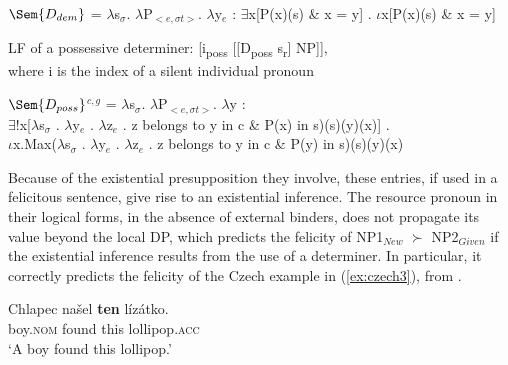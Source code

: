 \documentclass[output=paper,modfonts,nonflat]{langsci/langscibook}
\begin{document}
\ea
$\Sem{D_{dem}}$ = $\lambda$s$_{\sigma}$. $\lambda$P$_{<e,\sigma t>}$. $\lambda$y$_{e}$ : $\exists$x[P(x)(s) \& x = y] . $\iota$x[P(x)(s) \& x = y] \label{definition:demonstrative}
\z


\ea LF of a possessive determiner:
[i\textsubscript{poss} [[D\textsubscript{poss} s\textsubscript{r}] NP]],\\
where i is the index of a silent individual pronoun
\z

\ea
$\Sem{D_{poss}}$$^{c,g}$ = $\lambda$s$_{\sigma}$. $\lambda$P$_{<e,\sigma t>}$. $\lambda$y : \label{definition:possessive}\\
$\exists$!x[$\lambda$s$_{\sigma}$ . $\lambda$y$_{e}$ . $\lambda$z$_{e}$ .  z belongs to y in c \& P(x) in s)(s)(y)(x)] .\\
$\iota$x.Max($\lambda$s$_{\sigma}$ . $\lambda$y$_{e}$ . $\lambda$z$_{e}$ . z belongs to y in c \& P(y) in s)(s)(y)(x)
\z

Because of the existential presupposition they involve, these entries, if used in a felicitous sentence, give rise to an existential inference. The resource pronoun in their logical forms, in the absence of external binders, does not propagate its value beyond the local DP, which predicts the felicity of NP1$_{New}$ $\succ$ NP2$_{Given}$ if the existential inference results from the use of a determiner. In particular, it correctly predicts the felicity of the Czech example in (\ref{ex:czech3}), from \citet{Kucerova:2012}.

\ea \label{ex:czech3}
\gll Chlapec na\v{s}el {\bfseries ten} l\'{i}z\'{a}tko.\\
boy.\textsc{nom} found this lollipop.\textsc{acc}\\
\glt `A boy found this lollipop.'
\z


\end{document}
